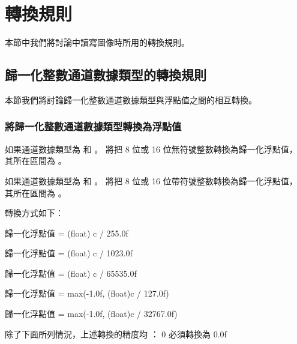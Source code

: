 \section[section:conversionRule]{轉換規則}

本節中我們將討論中讀寫圖像時所用的轉換規則。

\subsection{歸一化整數通道數據類型的轉換規則}

本節我們將討論歸一化整數通道數據類型與浮點值之間的相互轉換。

\subsubsection[section:normIntToFloat]{將歸一化整數通道數據類型轉換為浮點值}

如果通道數據類型為  和 。
 將把 8 位或 16 位無符號整數轉換為歸一化浮點值，
其所在區間為 \math{[0.0f \cdots 1.0]}。

如果通道數據類型為  和 。
 將把 8 位或 16 位帶符號整數轉換為歸一化浮點值，
其所在區間為 \math{[-1.0 \cdots 1.0]}。

轉換方式如下：

歸一化浮點值 = (float) c / 255.0f
\stopclCmmDesc

歸一化浮點值 = (float) c / 1023.0f
\stopclCmmDesc

歸一化浮點值 = (float) c / 65535.0f
\stopclCmmDesc

歸一化浮點值 = max(-1.0f, (float)c / 127.0f)
\stopclCmmDesc

歸一化浮點值 = max(-1.0f, (float)c / 32767.0f)
\stopclCmmDesc

除了下面所列情況，上述轉換的精度均 ：
0 必須轉換為 0.0f

